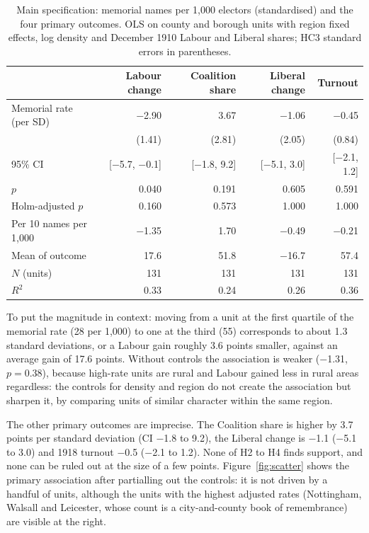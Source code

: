 \documentclass[11pt,a4paper]{article}
\begin{document}
\begin{table}[tbp]\centering\small\caption{Main specification: memorial names per 1,000 electors (standardised) and the four primary outcomes. OLS on county and borough units with region fixed effects, log density and December 1910 Labour and Liberal shares; HC3 standard errors in parentheses.}\label{tab:main}\begin{tabular}{lrrrr}\toprule & Labour change & Coalition share & Liberal change & Turnout\\\midrule
Memorial rate (per SD) & $-$2.90 & 3.67 & $-$1.06 & $-$0.45\\
 & (1.41) & (2.81) & (2.05) & (0.84)\\
95\% CI & [$-$5.7, $-$0.1] & [$-$1.8, 9.2] & [$-$5.1, 3.0] & [$-$2.1, 1.2]\\
$p$ & 0.040 & 0.191 & 0.605 & 0.591\\
Holm-adjusted $p$ & 0.160 & 0.573 & 1.000 & 1.000\\
Per 10 names per 1,000 & $-$1.35 & 1.70 & $-$0.49 & $-$0.21\\
Mean of outcome & 17.6 & 51.8 & $-$16.7 & 57.4\\
$N$ (units) & 131 & 131 & 131 & 131\\
$R^2$ & 0.33 & 0.24 & 0.26 & 0.36\\
\bottomrule\end{tabular}\end{table}

To put the magnitude in context: moving from a unit at the first quartile of the memorial rate (28 per 1,000) to one at the third (55) corresponds to about 1.3 standard deviations, or a Labour gain roughly 3.6 points smaller, against an average gain of 17.6 points. Without controls the association is weaker ($-$1.31, $p=0.38$), because high-rate units are rural and Labour gained less in rural areas regardless: the controls for density and region do not create the association but sharpen it, by comparing units of similar character within the same region.

The other primary outcomes are imprecise. The Coalition share is higher by 3.7 points per standard deviation (CI $-$1.8 to 9.2), the Liberal change is $-$1.1 ($-$5.1 to 3.0) and 1918 turnout $-$0.5 ($-$2.1 to 1.2). None of H2 to H4 finds support, and none can be ruled out at the size of a few points. Figure~\ref{fig:scatter} shows the primary association after partialling out the controls: it is not driven by a handful of units, although the units with the highest adjusted rates (Nottingham, Walsall and Leicester, whose count is a city-and-county book of remembrance) are visible at the right.
\end{document}
